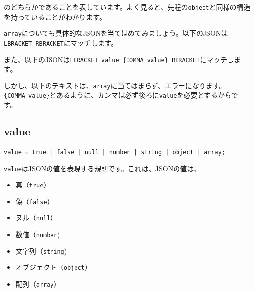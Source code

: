 のどちらかであることを表しています。よく見ると、先程の\texttt{object}と同様の構造を持っていることがわかります。

\texttt{array}についても具体的なJSONを当てはめてみましょう。以下のJSONは\texttt{LBRACKET\ RBRACKET}にマッチします。

\begin{Shaded}
\begin{Highlighting}[]
\NormalTok{[]}
\end{Highlighting}
\end{Shaded}

また、以下のJSONは\texttt{LBRACKET\ value\ \{COMMA\ value\}\ RBRACKET}にマッチします。

\begin{Shaded}
\begin{Highlighting}[]
\NormalTok{[}\NormalTok{]}
\NormalTok{[}\OperatorTok{,} \NormalTok{]}
\NormalTok{[}\OperatorTok{,} \OperatorTok{,} \NormalTok{]}
\NormalTok{[}\NormalTok{]}
\end{Highlighting}
\end{Shaded}

しかし、以下のテキストは、\texttt{array}に当てはまらず、エラーになります。\texttt{\{COMMA\ value\}}とあるように、カンマは必ず後ろに\texttt{value}を必要とするからです。

\begin{Shaded}
\begin{Highlighting}[]
\NormalTok{[}\OperatorTok{,}\NormalTok{] }
\end{Highlighting}
\end{Shaded}

\hypertarget{chapter3-value}{%
\subsection{value}\label{chapter3-value}}

\begin{verbatim}
value = true | false | null | number | string | object | array;
\end{verbatim}

\texttt{value}はJSONの値を表現する規則です。これは、JSONの値は、

\begin{itemize}
\tightlist
\item
  真（\texttt{true}）
\item
  偽（\texttt{false}）
\item
  ヌル（\texttt{null}）
\item
  数値（\texttt{number})
\item
  文字列（\texttt{string})
\item
  オブジェクト（\texttt{object}）
\item
  配列（\texttt{array}）
\end{itemize}

